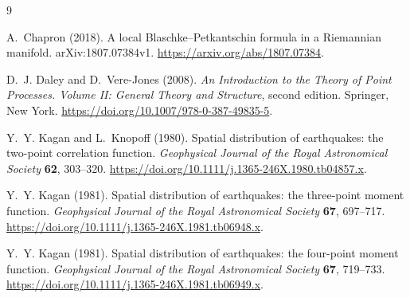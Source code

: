 \documentclass[11pt,a4paper]{article}
\numberwithin{equation}{section}
\theoremstyle{definition}
\theoremstyle{remark}
\begin{document}
\begin{thebibliography}{9}

A.~Chapron (2018).
\newblock A local Blaschke--Petkantschin formula in a Riemannian manifold.
\newblock arXiv:1807.07384v1.
\newblock \url{https://arxiv.org/abs/1807.07384}.

D.~J. Daley and D.~Vere-Jones (2008).
\newblock \emph{An Introduction to the Theory of Point Processes.
Volume II: General Theory and Structure}, second edition.
\newblock Springer, New York.
\newblock \url{https://doi.org/10.1007/978-0-387-49835-5}.

Y.~Y. Kagan and L.~Knopoff (1980).
\newblock Spatial distribution of earthquakes: the two-point correlation function.
\newblock \emph{Geophysical Journal of the Royal Astronomical Society}
\textbf{62}, 303--320.
\newblock \url{https://doi.org/10.1111/j.1365-246X.1980.tb04857.x}.

Y.~Y. Kagan (1981).
\newblock Spatial distribution of earthquakes: the three-point moment function.
\newblock \emph{Geophysical Journal of the Royal Astronomical Society}
\textbf{67}, 697--717.
\newblock \url{https://doi.org/10.1111/j.1365-246X.1981.tb06948.x}.

Y.~Y. Kagan (1981).
\newblock Spatial distribution of earthquakes: the four-point moment function.
\newblock \emph{Geophysical Journal of the Royal Astronomical Society}
\textbf{67}, 719--733.
\newblock \url{https://doi.org/10.1111/j.1365-246X.1981.tb06949.x}.

\end{thebibliography}
\end{document}

